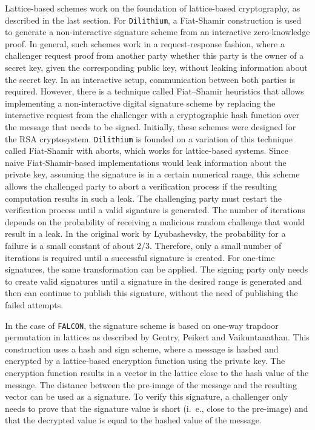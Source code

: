 Lattice-based schemes work on the foundation of lattice-based cryptography, as described in the last section. For \texttt{Dilithium}, a Fiat-Shamir construction is used to generate a non-interactive signature scheme from an interactive zero-knowledge proof. In general, such schemes work in a request-response fashion, where a challenger request proof from another party whether this party is the owner of a secret key, given the corresponding public key, without leaking information about the secret key. In an interactive setup, communication between both parties is required. However, there is a technique called Fiat–Shamir heuristics that allows implementing a non-interactive digital signature scheme by replacing the interactive request from the challenger with a cryptographic hash function over the message that needs to be signed. Initially, these schemes were designed for the \ac{RSA} cryptosystem\cite{fiat1986prove}. \texttt{Dilithium} is founded on a variation of this technique called Fiat-Shamir with aborts, which works for lattice-based systems. Since naive Fiat-Shamir-based implementations would leak information about the private key, assuming the signature is in a certain numerical range, this scheme allows the challenged party to abort a verification process if the resulting computation results in such a leak. The challenging party must restart the verification process until a valid signature is generated. The number of iterations depends on the probability of receiving a malicious random challenge that would result in a leak. In the original work by Lyubashevsky, the probability for a failure is a small constant of about \(2/3\). Therefore, only a small number of iterations is required until a successful signature is created. For one-time signatures, the same transformation can be applied. The signing party only needs to create valid signatures until a signature in the desired range is generated and then can continue to publish this signature, without the need of publishing the failed attempts\cite{10.1007/978-3-642-10366-7_35}.

In the case of \texttt{FALCON}, the signature scheme is based on one-way trapdoor permutation in lattices as described by Gentry, Peikert and Vaikuntanathan\cite{cryptoeprint:2007:432}. This construction uses a hash and sign scheme, where a message is hashed and encrypted by a lattice-based encryption function using the private key. The encryption function results in a vector in the lattice close to the hash value of the message. The distance between the pre-image of the message and the resulting vector can be used as a signature. To verify this signature, a challenger only needs to prove that the signature value is short (i.~e., close to the pre-image) and that the decrypted value is equal to the hashed value of the message.

